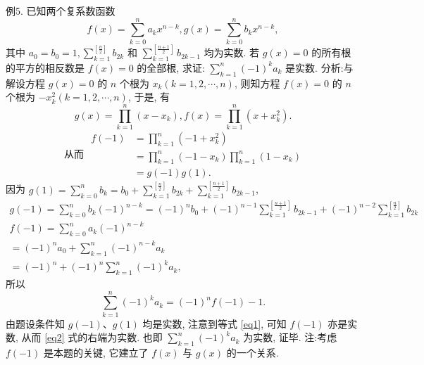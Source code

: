 例5. 已知两个复系数函数
$$
f(x)=\sum_{k=0}^n a_k x^{n-k}, g(x)=\sum_{k=0}^n b_k x^{n-k},
$$
其中 $a_0=b_0=1, \sum_{k=1}^{\left[\frac{n}{2}\right]} b_{2 k}$ 和 $\sum_{k=1}^{\left[\frac{n+1}{2}\right]} b_{2 k-1}$ 均为实数.
若 $g(x)=0$ 的所有根的平方的相反数是 $f(x)=0$ 的全部根, 求证: $\sum_{k=1}^n(-1)^k a_k$ 是实数.
分析:与解设方程 $g(x)=0$ 的 $n$ 个根为 $x_k(k=1,2, \cdots, n)$, 则知方程 $f(x)=0$ 的 $n$ 个根为 $-x_k^2(k=1,2, \cdots, n)$, 于是, 有
$$
g(x)=\prod_{k=1}^n\left(x-x_k\right), f(x)=\prod_{k=1}^n\left(x+x_k^2\right) .
$$
$$
\text { 从而 } \begin{aligned}
f(-1) & =\prod_{k=1}^n\left(-1+x_k^2\right) \\
& =\prod_{k=1}^n\left(-1-x_k\right) \prod_{k=1}^n\left(1-x_k\right) \\
& =g(-1) g(1) .
\end{aligned} \label{eq1}
$$
因为 $g(1)=\sum_{k=0}^n b_k=b_0+\sum_{k=1}^{\left[\frac{n}{2}\right]} b_{2 k}+\sum_{k=1}^{\left[\frac{n+1}{2}\right]} b_{2 k-1}$,
$$
\begin{aligned}
g(-1)=\sum_{k=0}^n b_k(-1)^{n-k}=(-1)^n b_0+(-1)^{n-1} \sum_{k=1}^{\left[\frac{n+1}{2}\right]} b_{2 k-1}+(-1)^{n-2} \sum_{k=1}^{\left[\frac{n}{2}\right]} b_{2 k} \\
f(-1)=\sum_{k=0}^n a_k(-1)^{n-k} \\
=(-1)^n a_0+\sum_{k=1}^n(-1)^{n-k} a_k \\
=(-1)^n+(-1)^n \sum_{k=1}^n(-1)^k a_k,
\end{aligned}
$$
所以
$$
\sum_{k=1}^n(-1)^k a_k=(-1)^n f(-1)-1 . \label{eq2}
$$
由题设条件知 $g(-1) 、 g(1)$ 均是实数, 注意到等式 \ref{eq1}, 可知 $f(-1)$ 亦是实数, 从而 \ref{eq2} 式的右端为实数.
也即 $\sum_{k=1}^n(-1)^k a_k$ 为实数, 证毕.
注:考虑 $f(-1)$ 是本题的关键, 它建立了 $f(x)$ 与 $g(x)$ 的一个关系.



